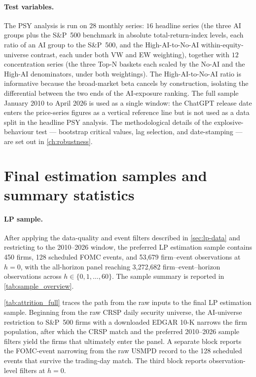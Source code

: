 \paragraph{Test variables.} The PSY analysis is run on $28$ monthly series: $16$ headline series (the three AI groups plus the S\&P~500 benchmark in absolute total-return-index levels, each ratio of an AI group to the S\&P~500, and the High-AI-to-No-AI within-equity-universe contrast, each under both VW and EW weighting), together with $12$ concentration series (the three Top-N baskets each scaled by the No-AI and the High-AI denominators, under both weightings). The High-AI-to-No-AI ratio is informative because the broad-market beta cancels by construction, isolating the differential between the two ends of the AI-exposure ranking. The full sample January 2010 to April 2026 is used as a single window: the ChatGPT release date enters the price-series figures as a vertical reference line but is not used as a data split in the headline PSY analysis. The methodological details of the explosive-behaviour test --- bootstrap critical values, lag selection, and date-stamping --- are set out in \cref{ch:robustness}.

\section{Final estimation samples and summary statistics}
\label{sec:final-sample}

\paragraph{LP sample.} After applying the data-quality and event filters described in \cref{sec:lp-data} and restricting to the 2010--2026 window, the preferred LP estimation sample contains 450 firms, 128 scheduled FOMC events, and 53{,}679 firm--event observations at $h=0$, with the all-horizon panel reaching 3{,}272{,}682 firm--event--horizon observations across $h \in \{0,1,\dots,60\}$. The sample summary is reported in \cref{tab:sample_overview}.

\begin{table}[!htbp]
\centering
\caption{Final LP estimation sample.}
\label{tab:sample_overview}

\end{table}

\cref{tab:attrition_full} traces the path from the raw inputs to the final LP estimation sample. Beginning from the raw CRSP daily security universe, the AI-universe restriction to S\&P~500 firms with a downloaded EDGAR 10-K narrows the firm population, after which the CRSP match and the preferred 2010--2026 sample filters yield the firms that ultimately enter the panel. A separate block reports the FOMC-event narrowing from the raw USMPD record to the 128 scheduled events that survive the trading-day match. The third block reports observation-level filters at $h=0$.


